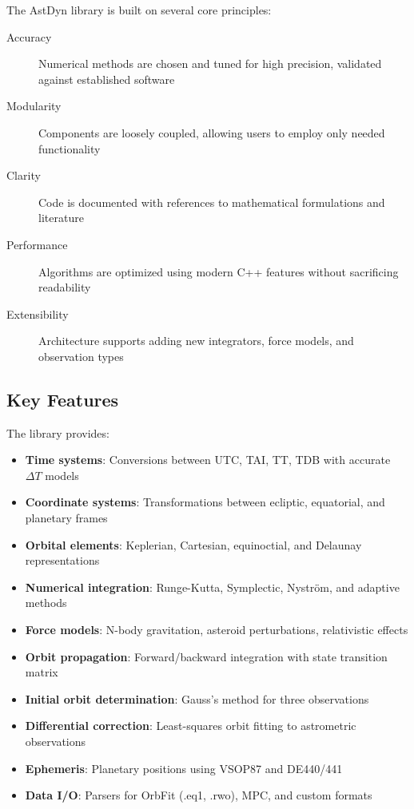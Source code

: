 The AstDyn library is built on several core principles:

\begin{description}
    \item[Accuracy] Numerical methods are chosen and tuned for high precision, validated against established software
    \item[Modularity] Components are loosely coupled, allowing users to employ only needed functionality
    \item[Clarity] Code is documented with references to mathematical formulations and literature
    \item[Performance] Algorithms are optimized using modern C++ features without sacrificing readability
    \item[Extensibility] Architecture supports adding new integrators, force models, and observation types
\end{description}

\subsection{Key Features}

The library provides:

\begin{itemize}
    \item \textbf{Time systems}: Conversions between UTC, TAI, TT, TDB with accurate $\Delta T$ models
    \item \textbf{Coordinate systems}: Transformations between ecliptic, equatorial, and planetary frames
    \item \textbf{Orbital elements}: Keplerian, Cartesian, equinoctial, and Delaunay representations
    \item \textbf{Numerical integration}: Runge-Kutta, Symplectic, Nystr\"om, and adaptive methods
    \item \textbf{Force models}: N-body gravitation, asteroid perturbations, relativistic effects
    \item \textbf{Orbit propagation}: Forward/backward integration with state transition matrix
    \item \textbf{Initial orbit determination}: Gauss's method for three observations
    \item \textbf{Differential correction}: Least-squares orbit fitting to astrometric observations
    \item \textbf{Ephemeris}: Planetary positions using VSOP87 and DE440/441
    \item \textbf{Data I/O}: Parsers for OrbFit (.eq1, .rwo), MPC, and custom formats
\end{itemize}

